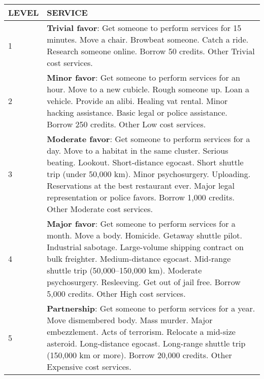 \begin{table}  \begin{tabularx}{\hline}{|l|X|} \hline

LEVEL &SERVICE \\ \hline

1 &\textbf{Trivial favor}: Get someone to perform services for 15 minutes. Move a chair. Browbeat someone. Catch a ride. Research someone online. Borrow 50 credits. Other Trivial cost services. \\ \hline

2 &\textbf{Minor favor}: Get someone to perform services for an hour. Move to a new cubicle. Rough someone up. Loan a vehicle. Provide an alibi. Healing vat rental. Minor hacking assistance. Basic legal or police assistance. Borrow 250 credits. Other Low cost services. \\ \hline

3 &\textbf{Moderate favor}: Get someone to perform services for a day. Move to a habitat in the same cluster. Serious beating. Lookout. Short-distance egocast. Short shuttle trip (under 50,000 km). Minor psychosurgery. Uploading. Reservations at the best restaurant ever. Major legal representation or police favors. Borrow 1,000 credits. Other Moderate cost services. \\ \hline

4 &\textbf{Major favor}: Get someone to perform services for a month. Move a body. Homicide. Getaway shuttle pilot. Industrial sabotage. Large-volume shipping contract on bulk freighter. Medium-distance egocast. Mid-range shuttle trip (50,000–150,000 km). Moderate psychosurgery. Resleeving. Get out of jail free. Borrow 5,000 credits. Other High cost services. \\ \hline

5 &\textbf{Partnership}: Get someone to perform services for a year. Move dismembered body. Mass murder. Major embezzlement. Acts of terrorism. Relocate a mid-size asteroid. Long-distance egocast. Long-range shuttle trip (150,000 km or more). Borrow 20,000 credits. Other Expensive cost services. \\ \hline

\end{tabularx} \end{table} 





